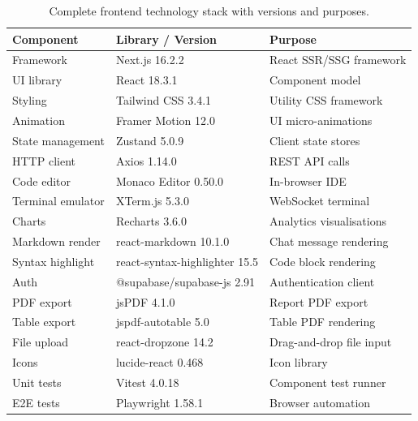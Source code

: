 \begin{table}[ht]
    \centering
    \caption{Complete frontend technology stack with versions and purposes.}
    \label{tab:frontend-stack}
    \renewcommand{\arraystretch}{1.3}
    \begin{tabular}{lll}
        \toprule
        \textbf{Component} & \textbf{Library / Version} & \textbf{Purpose} \\
        \midrule
        Framework           & Next.js 16.2.2        & React SSR/SSG framework \\
        UI library          & React 18.3.1          & Component model \\
        Styling             & Tailwind CSS 3.4.1    & Utility CSS framework \\
        Animation           & Framer Motion 12.0    & UI micro-animations \\
        State management    & Zustand 5.0.9         & Client state stores \\
        HTTP client         & Axios 1.14.0          & REST API calls \\
        Code editor         & Monaco Editor 0.50.0  & In-browser IDE \\
        Terminal emulator   & XTerm.js 5.3.0        & WebSocket terminal \\
        Charts              & Recharts 3.6.0        & Analytics visualisations \\
        Markdown render     & react-markdown 10.1.0 & Chat message rendering \\
        Syntax highlight    & react-syntax-highlighter 15.5 & Code block rendering \\
        Auth                & @supabase/supabase-js 2.91 & Authentication client \\
        PDF export          & jsPDF 4.1.0           & Report PDF export \\
        Table export        & jspdf-autotable 5.0   & Table PDF rendering \\
        File upload         & react-dropzone 14.2   & Drag-and-drop file input \\
        Icons               & lucide-react 0.468    & Icon library \\
        Unit tests          & Vitest 4.0.18         & Component test runner \\
        E2E tests           & Playwright 1.58.1     & Browser automation \\
        \bottomrule
    \end{tabular}
\end{table}

